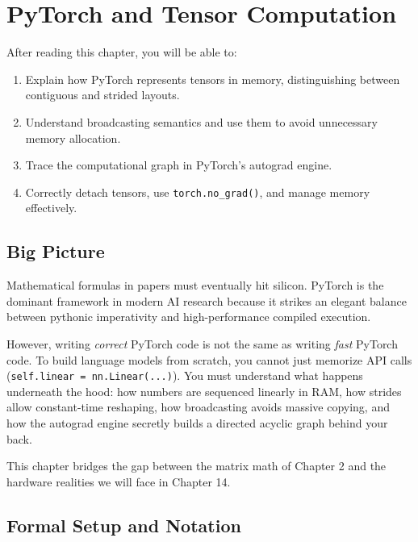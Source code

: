\chapter{PyTorch and Tensor Computation}
\label{ch:03}

\begin{keyinsight}
After reading this chapter, you will be able to:
\begin{enumerate}
  \item Explain how PyTorch represents tensors in memory, distinguishing between contiguous and strided layouts.
  \item Understand broadcasting semantics and use them to avoid unnecessary memory allocation.
  \item Trace the computational graph in PyTorch's autograd engine.
  \item Correctly detach tensors, use \texttt{torch.no\_grad()}, and manage memory effectively.
\end{enumerate}
\end{keyinsight}

\section{Big Picture}
\label{ch:03:sec:big_picture}

Mathematical formulas in papers must eventually hit silicon. PyTorch is the dominant framework in modern AI research because it strikes an elegant balance between pythonic imperativity and high-performance compiled execution. 

However, writing \emph{correct} PyTorch code is not the same as writing \emph{fast} PyTorch code. To build language models from scratch, you cannot just memorize API calls (\texttt{self.linear = nn.Linear(...)}). You must understand what happens underneath the hood: how numbers are sequenced linearly in RAM, how strides allow constant-time reshaping, how broadcasting avoids massive copying, and how the autograd engine secretly builds a directed acyclic graph behind your back.

This chapter bridges the gap between the matrix math of Chapter 2 and the hardware realities we will face in Chapter 14.

\section{Formal Setup and Notation}
\label{ch:03:sec:setup}

